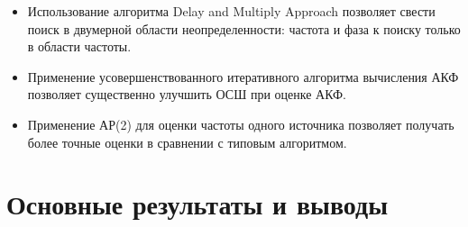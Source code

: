 \begin{itemize}
\item Использование алгоритма Delay and Multiply Approach позволяет свести поиск в двумерной области неопределенности: частота и фаза к поиску только в области частоты. 
\item Применение усовершенствованного итеративного алгоритма вычисления АКФ позволяет существенно улучшить ОСШ при оценке АКФ.
\item Применение АР(2) для оценки частоты одного источника позволяет получать более точные оценки в сравнении с типовым алгоритмом.
\end{itemize}

\clearpage

\chapter*{Основные результаты и выводы}

